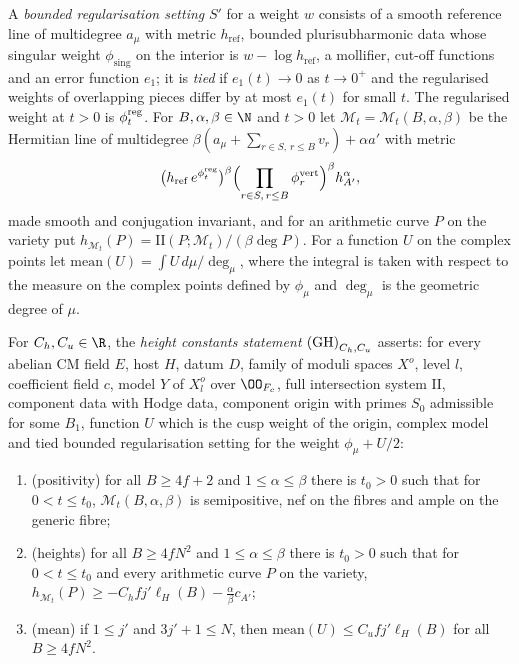 A \emph{bounded regularisation setting} $S'$ for a weight $w$ consists of a smooth reference line of
multidegree $a_\mu$ with metric $h_{\mathrm{ref}}$, bounded plurisubharmonic data whose singular weight
$\phi_{\mathrm{sing}}$ on the interior is $w-\log h_{\mathrm{ref}}$, a mollifier, cut-off functions and an
error function $e_1$; it is \emph{tied} if $e_1(t)\to0$ as $t\to0^+$ and the regularised weights of
overlapping pieces differ by at most $e_1(t)$ for small $t$. The regularised weight at $t>0$ is
$\phi^{\mathrm{reg}}_t$. For $B,\alpha,\beta\in\N$ and $t>0$ let $\mathcal M_t=\mathcal M_t(B,\alpha,\beta)$ be the Hermitian line of
multidegree $\beta(a_\mu+\sum_{r\in S,\,r\le B}v_r)+\alpha a'$ with metric
\[
\bigl(h_{\mathrm{ref}}\,e^{\phi^{\mathrm{reg}}_t}\bigr)^\beta\Bigl(\prod_{r\in S,\,r\le B}\phi^{\mathrm{vert}}_r\Bigr)^\beta
h_{A'}^\alpha,
\]
made smooth and conjugation invariant, and for an arithmetic curve $P$ on the variety put
$h_{\mathcal M_t}(P)=\mathrm{II}(P;\mathcal M_t)/(\beta\deg P)$. For a function $U$ on the complex points let
$\mathrm{mean}(U)=\int U\,d\mu/\deg_\mu$, where the integral is taken with respect to the measure on the
complex points defined by $\phi_\mu$ and $\deg_\mu$ is the geometric degree of $\mu$.

\begin{definition}\label{pf:towergeo:def-nine}
For $C_h,C_u\in\R$, the \emph{height constants statement} $\textup{(GH)}_{C_h,C_u}$ asserts: for every
abelian CM field $E$, host $H$, datum $D$, family of moduli spaces $X^o$, level $l$, coefficient field $c$,
model $Y$ of $X^o_l$ over $\OO_{F_c}$, full intersection system $\mathrm{II}$, component data with Hodge
data, component origin with primes $S_0$ admissible for some $B_1$, function $U$ which is the cusp weight
of the origin, complex model and tied bounded regularisation setting for the weight $\phi_\mu+U/2$:
\begin{enumerate}[label=(\alph*)]
\item (positivity) for all $B\ge4f+2$ and $1\le\alpha\le\beta$ there is $t_0>0$ such that for $0<t\le t_0$,
  $\mathcal M_t(B,\alpha,\beta)$ is semipositive, nef on the fibres and ample on the generic fibre;
\item (heights) for all $B\ge4fN^2$ and $1\le\alpha\le\beta$ there is $t_0>0$ such that for $0<t\le t_0$ and every
  arithmetic curve $P$ on the variety, $h_{\mathcal M_t}(P)\ge-C_hfj'\ell_H(B)-\frac\alpha\beta c_{A'}$;
\item (mean) if $1\le j'$ and $3j'+1\le N$, then $\mathrm{mean}(U)\le C_ufj'\ell_H(B)$ for all
  $B\ge4fN^2$.
\end{enumerate}
\end{definition}


